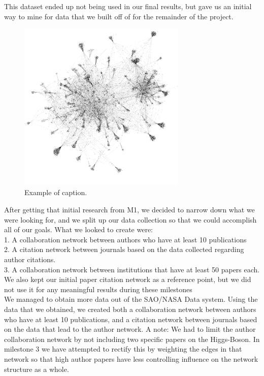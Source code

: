 \documentclass[times, 10pt,twocolumn]{article}
\begin{document}
This dataset ended up not being used in our final results, but gave us an initial way to mine for data that we built off of for the remainder of the project.

\begin{figure}[h]
   \includegraphics[width=8cm]{figure1.png}
   \caption{Example of caption.}
\end{figure}

After getting that initial research from M1, we decided to narrow down what we were looking for, and we split up our data collection so that we could accomplish all of our goals. What we looked to create were: \\
1. A collaboration network between authors who have at least 10 publications \\
2. A citation network between journals based on the data collected regarding author citations.\\
3. A collaboration network between institutions that have at least 50 papers each.\\

We also kept our initial paper citation network as a reference point, but we did not use it for any meaningful results during these milestones \\

We managed to obtain more data out of the SAO/NASA Data system. Using the data that we obtained, we created both a collaboration network between authors who have at least 10 publications, and a citation network between journals based on the data that lead to the author network. A note: We had to limit the author collaboration network by not including two specific papers on the Higgs-Boson. In milestone 3 we have attempted to rectify this by weighting the edges in that network so that high author papers have less controlling influence on the network structure as a whole. \\
\end{document}
